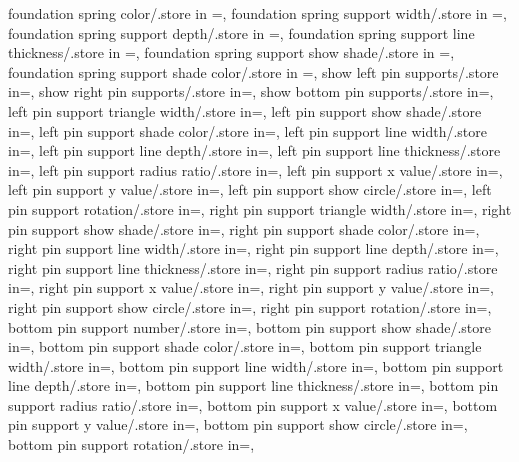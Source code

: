 {  foundation spring color/.store in =\foundspringcolor,
  foundation spring support width/.store in =\foundsuppwidth,
  foundation spring support depth/.store in =\foundsuppdepth,
  foundation spring support line thickness/.store in =\foundsupplinethk,
  foundation spring support show shade/.store in =\foundshowsuppshade,
  foundation spring support shade color/.store in =\foundsuppshadecol,
  show left pin supports/.store in=\showleftpinsup,
  show right pin supports/.store in=\showrightpinsup,
  show bottom pin supports/.store in=\showbottompinsup,
left pin support triangle width/.store in=\lefttriw,
left pin support show shade/.store in=\showleftpinsuppshade,
left pin support shade color/.store in=\leftpinsuppshadecolor,
left pin support line width/.store in=\leftlinew,
left pin support line depth/.store in=\leftlined,
left pin support line thickness/.store in=\leftlinet,
left pin support radius ratio/.store in=\leftradratio,
left pin support x value/.store in=\leftxvalue,
left pin support y value/.store in=\leftyvalue,
left pin support show circle/.store in=\leftshowcircle,
left pin support rotation/.store in=\leftrotpin,
right pin support triangle width/.store in=\righttriw,
right pin support show shade/.store in=\showrightpinsuppshade,
right pin support shade color/.store in=\rightpinsuppshadecolor,
right pin support line width/.store in=\rightlinew,
right pin support line depth/.store in=\rightlined,
right pin support line thickness/.store in=\rightlinet,
right pin support radius ratio/.store in=\rightradratio,
right pin support x value/.store in=\rightxvalue,
right pin support y value/.store in=\rightyvalue,
right pin support show circle/.store in=\rightshowcircle,
right pin support rotation/.store in=\rightrotpin,
bottom pin support number/.store in=\nbotpin,
bottom pin support show shade/.store in=\showbottompinsuppshade,
bottom pin support shade color/.store in=\bottompinsuppshadecolor,
bottom pin support triangle width/.store in=\bottomtriw,
bottom pin support line width/.store in=\bottomlinew,
bottom pin support line depth/.store in=\bottomlined,
bottom pin support line thickness/.store in=\bottomlinet,
bottom pin support radius ratio/.store in=\bottomradratio,
bottom pin support x value/.store in=\bottomxvalue,
bottom pin support y value/.store in=\bottomyvalue,
bottom pin support show circle/.store in=\bottomshowcircle,
bottom pin support rotation/.store in=\bottomrotpin,}
